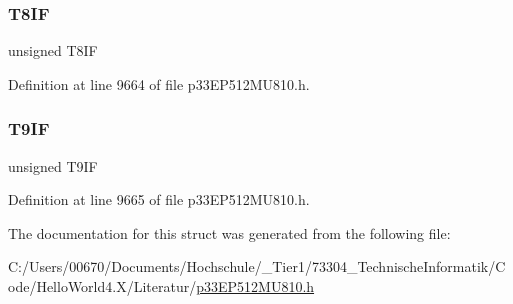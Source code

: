 \subsubsection{\texorpdfstring{T8\+IF}{T8IF}}
{\footnotesize\ttfamily unsigned T8\+IF}



Definition at line 9664 of file p33\+E\+P512\+M\+U810.\+h.

\mbox{\label{structtag_i_f_s3_b_i_t_s_a5443cbecb88151f8b0b6b4fc324b60ce}} 
\subsubsection{\texorpdfstring{T9\+IF}{T9IF}}
{\footnotesize\ttfamily unsigned T9\+IF}



Definition at line 9665 of file p33\+E\+P512\+M\+U810.\+h.



The documentation for this struct was generated from the following file\+:\begin{DoxyCompactItemize}
\item 
C\+:/\+Users/00670/\+Documents/\+Hochschule/\+\_\+\+Tier1/73304\+\_\+\+Technische\+Informatik/\+Code/\+Hello\+World4.\+X/\+Literatur/\hyperlink{p33_e_p512_m_u810_8h}{p33\+E\+P512\+M\+U810.\+h}\end{DoxyCompactItemize}
